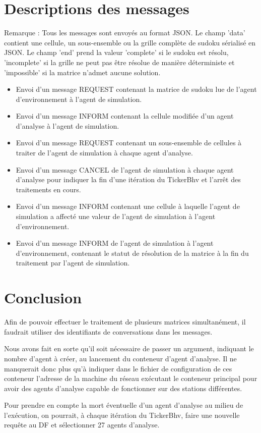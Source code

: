 \documentclass[a4paper,11pt]{article}
\begin{document}
\section{Descriptions des messages}
\begin{framed}
Remarque : Tous les messages sont envoyés au format JSON. Le champ 'data' contient une cellule, un sous-ensemble ou la grille complète de sudoku sérialisé en JSON. Le champ 'end' prend la valeur 'complete' si le sudoku est résolu, 'incomplete' si la grille ne peut pas être résolue de manière déterministe et 'impossible' si la matrice n'admet aucune solution.
\end{framed}
\begin{itemize}
\item Envoi d'un message REQUEST contenant la matrice de sudoku lue de l'agent d'environnement à l'agent de simulation.
\item Envoi d'un message INFORM contenant la cellule modifiée d'un agent d'analyse à l'agent de simulation.
\item Envoi d'un message REQUEST contenant un sous-ensemble de cellules à traiter de l'agent de simulation à chaque agent d'analyse.
\item Envoi d'un message CANCEL de l'agent de simulation à chaque agent d'analyse pour indiquer la fin d'une itération du TickerBhv et l'arrêt des traitements en cours.
\item Envoi d'un message INFORM contenant une cellule à laquelle l'agent de simulation a affecté une valeur de l'agent de simulation à l'agent d'environnement.
\item Envoi d'un message INFORM de l'agent de simulation à l'agent d'environnement, contenant le statut de résolution de la matrice à la fin du traitement par l'agent de simulation.
\end{itemize}

\section{Conclusion}
Afin de pouvoir effectuer le traitement de plusieurs matrices simultanément, il faudrait utiliser des identifiants de conversations dans les messages. 

Nous avons fait en sorte qu'il soit nécessaire de passer un argument, indiquant le nombre d'agent à créer, au lancement du conteneur d'agent d'analyse.
Il ne manquerait donc plus qu'à indiquer dans le fichier de configuration de ces conteneur l'adresse de la machine du réseau exécutant le conteneur principal pour avoir des agents d'analyse capable de fonctionner sur des stations différentes.

Pour prendre en compte la mort éventuelle d'un agent d'analyse au milieu de l'exécution, on pourrait, à chaque itération du TickerBhv, faire une nouvelle requête au DF et sélectionner 27 agents d'analyse.

\end{document}
